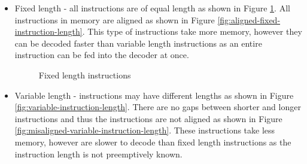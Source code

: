 \documentclass{report}
\begin{document}
\begin{itemize}
    \item{Fixed length - all instructions are of equal length as shown in Figure
        \ref{fig:fixed-instruction-length}. All instructions in memory are
        aligned as shown in Figure \ref{fig:aligned-fixed-instruction-length}.
        This type of instructions take more memory, however they can be decoded
        faster than variable length instructions as an entire instruction can
        be fed into the decoder at once.}

    \begin {figure}[H]
    \centering
    \caption {Fixed length instructions}
    \label {fig:fixed-instruction-length}
    \end {figure}


    \item{Variable length - instructions may have different lengths as shown in
        Figure \ref{fig:variable-instruction-length}. There are
        no gaps between shorter and longer instructions and thus the
        instructions are not aligned as shown in Figure
        \ref{fig:misaligned-variable-instruction-length}. These instructions
        take less memory, however are slower to decode than fixed length
        instructions as the instruction length is not preemptively known.}
\end{itemize}
\end{document}

